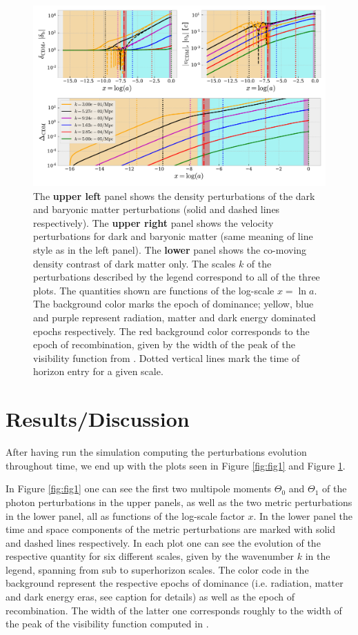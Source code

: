\documentclass[twocolumn]{aastex62}
\begin{document}
\begin{figure}
    \includegraphics[scale = 0.65]{Figures/fig2.pdf}
    \caption{The \textbf{upper left} panel shows the density perturbations of the dark and baryonic matter perturbations (solid and dashed lines respectively). The \textbf{upper right} panel shows the velocity perturbations for dark and baryonic matter (same meaning of line style as in the left panel). The \textbf{lower} panel shows the co-moving density contrast of dark matter only. The scales $k$ of the perturbations described by the legend correspond to all of the three plots. The quantities shown are functions of the log-scale $x = \ln a$.  The background color marks the epoch of dominance; yellow, blue and purple represent radiation, matter and dark energy dominated epochs respectively. The red background color corresponds to the epoch of recombination, given by the width of the peak of the visibility function from \cite{stutzer:2020b}. Dotted vertical lines mark the time of horizon entry for a given scale.}
    \label{fig:fig2}
\end{figure}


\section{Results/Discussion}\label{sec:Results}

After having run the simulation computing the perturbations evolution throughout time, we end up with the plots seen in Figure \ref{fig:fig1} and Figure \ref{fig:fig2}.

In Figure \ref{fig:fig1} one can see the first two multipole moments $\Theta_0$ and $\Theta_1$ of the photon perturbations in the upper panels, as well as the two metric perturbations in the lower panel, all as functions of the log-scale factor $x$. In the lower panel the time and space components of the metric perturbations are marked with solid and dashed lines respectively. In each plot one can see the evolution of the respective quantity for six different scales, given by the wavenumber $k$ in the legend, spanning from sub to superhorizon scales. The color code in the background represent the respective epochs of dominance (i.e. radiation, matter and dark energy eras, see caption for details) as well as the epoch of recombination. The width of the latter one corresponds roughly to the width of the peak of the visibility function computed in \cite{stutzer:2020b}. 
\end{document}

